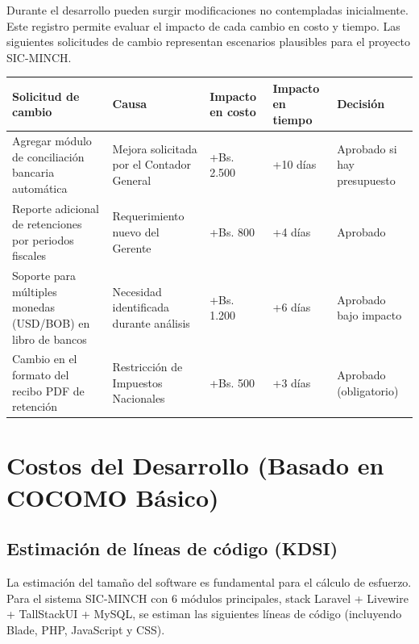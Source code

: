 \documentclass[stu]{apa7}
\begin{document}
Durante el desarrollo pueden surgir modificaciones no contempladas inicialmente. Este registro permite evaluar el impacto de cada cambio en costo y tiempo. Las siguientes solicitudes de cambio representan escenarios plausibles para el proyecto SIC-MINCH.

\begin{longtable}{|L{3.5cm}|L{3cm}|C{1.5cm}|C{1.5cm}|L{2.5cm}|}
\hline
{}
\textbf{Solicitud de cambio} & \textbf{Causa} & \textbf{Impacto en costo} & \textbf{Impacto en tiempo} & \textbf{Decisión} \\
\hline
Agregar módulo de conciliación bancaria automática & Mejora solicitada por el Contador General & +Bs. 2.500 & +10 días & Aprobado si hay presupuesto \\
\hline
Reporte adicional de retenciones por periodos fiscales & Requerimiento nuevo del Gerente & +Bs. 800 & +4 días & Aprobado \\
\hline
Soporte para múltiples monedas (USD/BOB) en libro de bancos & Necesidad identificada durante análisis & +Bs. 1.200 & +6 días & Aprobado bajo impacto \\
\hline
Cambio en el formato del recibo PDF de retención & Restricción de Impuestos Nacionales & +Bs. 500 & +3 días & Aprobado (obligatorio) \\
\hline
\end{longtable}

\section{Costos del Desarrollo (Basado en COCOMO Básico)}

\subsection{Estimación de líneas de código (KDSI)}

La estimación del tamaño del software es fundamental para el cálculo de esfuerzo. Para el sistema SIC-MINCH con 6 módulos principales, stack Laravel + Livewire + TallStackUI + MySQL, se estiman las siguientes líneas de código (incluyendo Blade, PHP, JavaScript y CSS).
\end{document}
